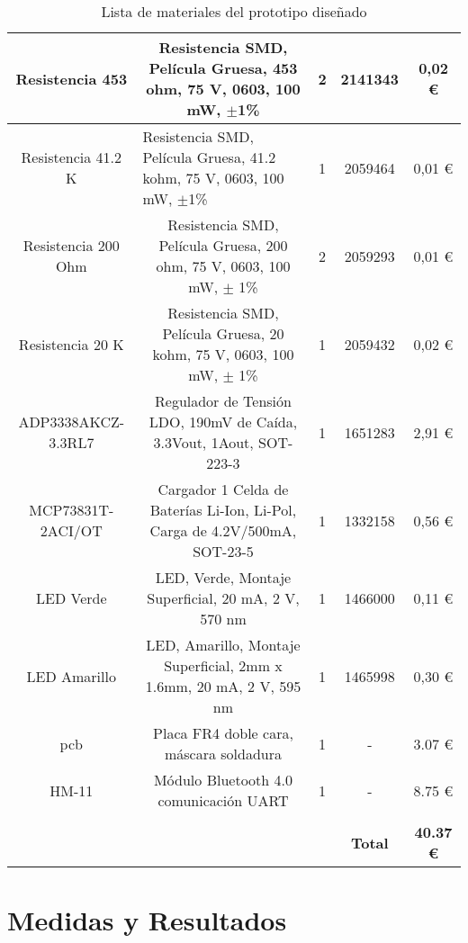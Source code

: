 \begin{table}[H]
{{\begin{tabular}{rrr|c|c|}
	\hline
	\multicolumn{1}{|c|}{Resistencia 453} & \multicolumn{1}{c|}{Resistencia SMD, Película Gruesa, 453 ohm, 75 V, 0603, 100 mW, $\pm$1\%} & \multicolumn{1}{c|}{2} & 2141343 & 0,02 \euro \tabularnewline
	\hline
	\multicolumn{1}{|c|}{Resistencia 41.2 K} & \multicolumn{1}{l|}{Resistencia SMD, Película Gruesa, 41.2 kohm, 75 V, 0603, 100 mW, $\pm$1\%} & \multicolumn{1}{c|}{1} & 2059464 & 0,01 \euro \tabularnewline
	\hline
	\multicolumn{1}{|c|}{Resistencia 200 Ohm} & \multicolumn{1}{c|}{Resistencia SMD, Película Gruesa, 200 ohm, 75 V, 0603, 100 mW, $\pm$ 1\%} & \multicolumn{1}{c|}{2} & 2059293 & 0,01 \euro \tabularnewline
	\hline
	\multicolumn{1}{|c|}{Resistencia 20 K} & \multicolumn{1}{c|}{Resistencia SMD, Película Gruesa, 20 kohm, 75 V, 0603, 100 mW, $\pm$ 1\%} & \multicolumn{1}{c|}{1} & 2059432 & 0,02 \euro \tabularnewline
	\hline
	\multicolumn{1}{|c|}{ADP3338AKCZ-3.3RL7} & \multicolumn{1}{c|}{Regulador de Tensión LDO, 190mV de Caída, 3.3Vout, 1Aout, SOT-223-3} & \multicolumn{1}{c|}{1} & 1651283 & 2,91 \euro \tabularnewline
	\hline
	\multicolumn{1}{|c|}{MCP73831T-2ACI/OT} & \multicolumn{1}{c|}{Cargador 1 Celda de Baterías Li-Ion, Li-Pol,  Carga de 4.2V/500mA, SOT-23-5} & \multicolumn{1}{c|}{1} & 1332158 & 0,56 \euro \tabularnewline
	\hline
	\multicolumn{1}{|c|}{LED Verde} & \multicolumn{1}{c|}{LED, Verde, Montaje Superficial, 20 mA, 2 V, 570 nm} & \multicolumn{1}{c|}{1} & 1466000 & 0,11 \euro \tabularnewline
	\hline
	\multicolumn{1}{|c|}{LED Amarillo} & \multicolumn{1}{c|}{LED, Amarillo, Montaje Superficial, 2mm x 1.6mm, 20 mA, 2 V, 595 nm} & \multicolumn{1}{c|}{1} & 1465998 & 0,30 \euro \tabularnewline
	\hline
	\multicolumn{1}{|c|}{\acrshort{pcb}} & \multicolumn{1}{c|}{Placa FR4 doble cara, máscara soldadura } & \multicolumn{1}{c|}{1} & - & 3.07 \euro \tabularnewline
	\hline
	\multicolumn{1}{|c|}{HM-11} & \multicolumn{1}{c|}{Módulo Bluetooth 4.0 comunicación UART } & \multicolumn{1}{c|}{1} & - & 8.75 \euro \tabularnewline
	\hline
	      &       & \multicolumn{1}{r}{} & \multicolumn{1}{r}{} & \multicolumn{1}{r}{} \tabularnewline
	\cline{4-5}      &       &       & \textbf{Total} & \textbf{40.37 \euro} \tabularnewline
	\cline{4-5}\end{tabular}%
    
}
}
\caption{Lista de materiales del prototipo diseñado}
\label{tab:BOM}
\end{table}



\section{Medidas y Resultados}

